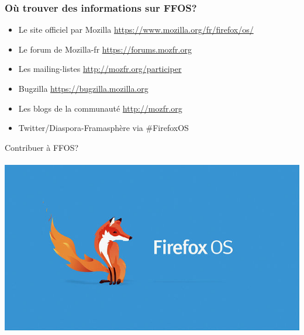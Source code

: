 \documentclass{beamer}
\begin{document}
\begin{frame}
\frametitle{Où trouver des informations sur FFOS?}
\begin{itemize}
\item Le site officiel par Mozilla \url{https://www.mozilla.org/fr/firefox/os/}
\item Le forum de Mozilla-fr \url{https://forums.mozfr.org}
\item Les mailing-listes \url{http://mozfr.org/participer}
\item Bugzilla \url{https://bugzilla.mozilla.org}
\item Les blogs de la communauté \url{http://mozfr.org}
\item Twitter/Diaspora-Framasphère via \#FirefoxOS
\end{itemize}
\end{frame}

\begin{frame}
\begin{center}
\Huge{Contribuer à FFOS?}
\\~\\
\includegraphics[scale=0.3]{./images/firefox-os.jpg}
\end{center}
\end{frame}
\end{document}

